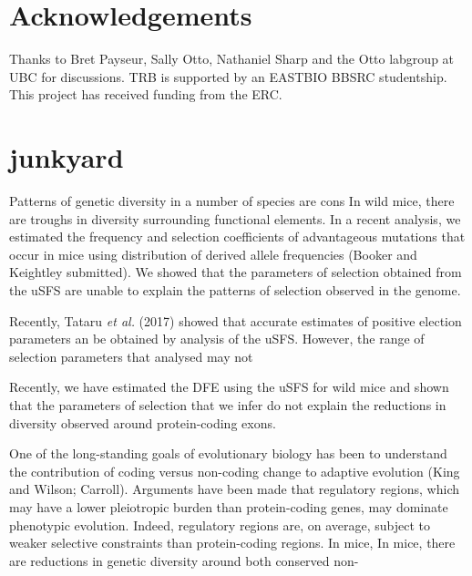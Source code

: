 \documentclass[11pt]{article}
\newcommand{\beginsupplement}{%
        \setcounter{table}{0}
        \renewcommand{\thetable}{S\arabic{table}}%
        \setcounter{figure}{0}
        \renewcommand{\thefigure}{S\arabic{figure}}%
     }
\begin{document}
\section*{Acknowledgements}

Thanks to Bret Payseur, Sally Otto, Nathaniel Sharp and the Otto labgroup at UBC for discussions. TRB is supported by an EASTBIO BBSRC studentship. This project has received funding from the ERC.

 
%

\beginsupplement

\newpage





\section*{junkyard}

Patterns of genetic diversity in a number of species are cons
In wild mice, there are troughs in diversity surrounding functional elements. In a recent analysis, we estimated the frequency and selection coefficients of advantageous mutations that occur in mice using distribution of derived allele frequencies (Booker and Keightley submitted). We showed that the parameters of selection obtained from the uSFS are unable to explain the patterns of selection observed in the genome.

Recently, Tataru \textit{et al.} (2017) showed that accurate estimates of positive election parameters an be obtained by analysis of the uSFS. However, the range of selection parameters that analysed may not

Recently, we have estimated the DFE using the uSFS for wild mice and shown that the parameters of selection that we infer do not explain the reductions in diversity observed around protein-coding exons. 


One of the long-standing goals of evolutionary biology has been to understand the contribution of coding versus non-coding change to adaptive evolution (King and Wilson; Carroll). Arguments have been made that regulatory regions, which may have a lower pleiotropic burden than protein-coding genes, may dominate phenotypic evolution. Indeed, regulatory regions are, on average,  subject to weaker selective constraints than protein-coding regions. In mice, 
In mice, there are reductions in genetic diversity around both conserved non-
\end{document}

